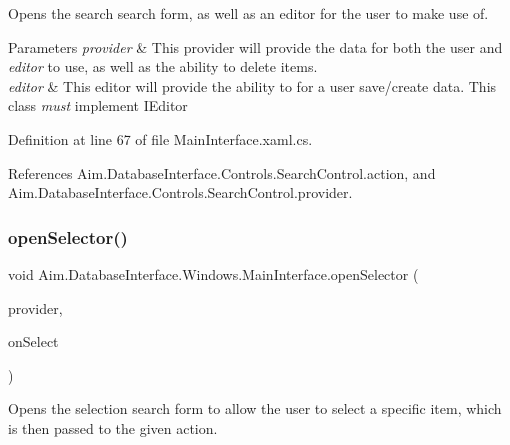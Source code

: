 Opens the \textquotesingle{}search\textquotesingle{} search form, as well as an editor for the user to make use of. 


\begin{DoxyParams}{Parameters}
{\em provider} & This provider will provide the data for both the user and {\itshape editor}  to use, as well as the ability to delete items. \\
\hline
{\em editor} & This editor will provide the ability to for a user save/create data. This class {\itshape must} implement I\+Editor \\
\hline
\end{DoxyParams}


Definition at line 67 of file Main\+Interface.\+xaml.\+cs.



References Aim.\+Database\+Interface.\+Controls.\+Search\+Control.\+action, and Aim.\+Database\+Interface.\+Controls.\+Search\+Control.\+provider.

\mbox{\label{class_aim_1_1_database_interface_1_1_windows_1_1_main_interface_a847da5c5a3132847df23e9bbd3118ac1}} 
\subsubsection{\texorpdfstring{open\+Selector()}{openSelector()}}
{\footnotesize\ttfamily void Aim.\+Database\+Interface.\+Windows.\+Main\+Interface.\+open\+Selector (\begin{DoxyParamCaption}\item[{\mbox{\hyperlink{interface_aim_1_1_database_interface_1_1_interfaces_1_1_i_search_provider}{I\+Search\+Provider}}}]{provider,  }\item[{Action$<$ Object $>$}]{on\+Select }\end{DoxyParamCaption})\hspace{0.3cm}{\ttfamily [inline]}}



Opens the \textquotesingle{}selection\textquotesingle{} search form to allow the user to select a specific item, which is then passed to the given action. 


